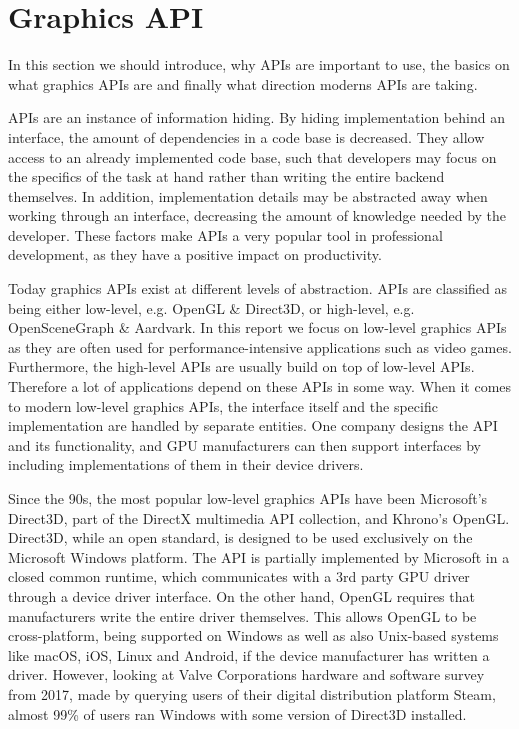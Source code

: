 \section{Graphics \acrshort{API}}\label{sec:graphics_APIs}
\begin{sectionmeta}
In this section we should introduce, why APIs are important to use, the basics on what graphics APIs are and finally what direction moderns APIs are taking.
\end{sectionmeta}
\glspl{API} are an instance of information hiding.
By hiding implementation behind an interface, the amount of dependencies in a code base is decreased.  
They allow access to an already implemented code base, such that developers may focus on the specifics of the task at hand rather than writing the entire backend themselves.
In addition, implementation details may be abstracted away when working through an interface,  decreasing the amount of knowledge needed by the developer.
These factors make \glspl{API} a very popular tool in professional development, as they have a positive impact on productivity. 

Today graphics \glspl{API} exist at different levels of abstraction. 
\glspl{API} are classified as being either low-level, e.g. OpenGL \& Direct3D, or high-level, e.g. OpenSceneGraph \& Aardvark.
In this report we focus on low-level graphics \glspl{API} as they are often used for performance-intensive applications such as video games.
Furthermore, the high-level \glspl{API} are usually build on top of low-level \glspl{API}.  
Therefore a lot of applications depend on these \glspl{API} in some way.
When it comes to modern low-level graphics \glspl{API}, the interface itself and the specific implementation are handled by separate entities. 
One company designs the \gls{API} and its functionality, and \gls{GPU} manufacturers can then support interfaces by including implementations of them in their device drivers.

Since the 90s, the most popular low-level graphics \glspl{API} have been Microsoft’s Direct3D, part of the DirectX multimedia \gls{API} collection, and Khrono’s OpenGL. 
Direct3D, while an open standard, is designed to be used exclusively on the Microsoft Windows platform.
The \gls{API} is partially implemented by Microsoft in a closed common runtime, which communicates with a 3rd party \gls{GPU} driver through a device driver interface.
On the other hand, OpenGL requires that manufacturers write the entire driver themselves.
This allows OpenGL to be cross-platform, being supported on Windows as well as also Unix-based systems like macOS, iOS, Linux and Android, if the device manufacturer has written a driver.
However, looking at Valve Corporations hardware and software survey from 2017\cite{steamsurvey}, made by querying users of their digital distribution platform Steam,  almost 99\% of users ran Windows with some version of Direct3D installed. 

